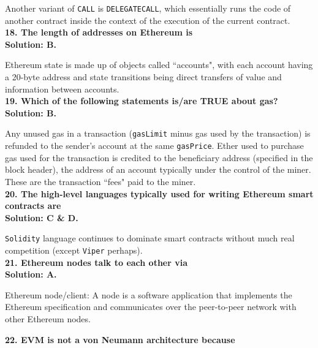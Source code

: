 Another variant of \verb|CALL| is \verb|DELEGATECALL|, which essentially runs the code of another contract inside the context of the execution of the current contract.\\

\textbf{18. The length of addresses on Ethereum is}\label{sec:exam1_q18}\\

\textbf{Solution: B.}

Ethereum state is made up of objects called ``accounts", with each account having a 20-byte address and state transitions being direct transfers of value and information between accounts.\\

\textbf{19. Which of the following statements is/are TRUE about gas?}\label{sec:exam1_q19}\\

\textbf{Solution: B.}

Any unused gas in a transaction (\verb|gasLimit| minus gas used by the transaction) is refunded to the sender's account at the same \verb|gasPrice|.
Ether used to purchase gas used for the transaction is credited to the beneficiary address (specified in the block header), the address of an account typically under the control of the miner.
These are the transaction ``fees" paid to the miner.\\

\textbf{20. The high-level languages typically used for writing Ethereum smart contracts are}\label{sec:exam1_q20}\\

\textbf{Solution: C \& D.}

\verb|Solidity| language continues to dominate smart contracts without much real competition (except \verb|Viper| perhaps).\\

\textbf{21. Ethereum nodes talk to each other via}\label{sec:exam1_q21}\\

\textbf{Solution: A.}

Ethereum node/client: A node is a software application that implements the Ethereum specification and communicates over the peer-to-peer network with other Ethereum nodes.\\

\pagebreak

\textbf{22. EVM is not a von Neumann architecture because}\label{sec:exam1_q22}\\


